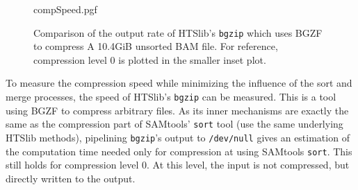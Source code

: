 \begin{figure}[ht]
        {compSpeed.pgf}
    \caption{Comparison of the output rate of HTSlib's \texttt{bgzip} which uses BGZF to compress A 10.4GiB unsorted BAM file. For reference, compression level 0 is plotted in the smaller inset plot.}
    \label{fig:compSpeed}
\end{figure}
To measure the compression speed while minimizing the influence of the sort and merge processes, the speed of HTSlib's \texttt{bgzip} can be measured. This is a tool using BGZF to compress arbitrary files. As its inner mechanisms are exactly the same as the compression part of SAMtools' \texttt{sort} tool (use the same underlying HTSlib methods), pipelining \texttt{bgzip}'s output to \texttt{/dev/null} gives an estimation of the computation time needed only for compression at using SAMtools \texttt{sort}. This still holds for compression level 0. At this level, the input is not compressed, but directly written to the output.


